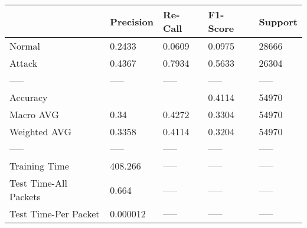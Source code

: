 \begin{tabular}{lllll}
\toprule
{} & Precision & Re-Call & F1-Score & Support \\
\midrule
Normal                &    0.2433 &  0.0609 &   0.0975 &   28666 \\
Attack                &    0.4367 &  0.7934 &   0.5633 &   26304 \\
-----                 &     ----- &   ----- &    ----- &   ----- \\
Accuracy              &           &         &   0.4114 &   54970 \\
Macro AVG             &      0.34 &  0.4272 &   0.3304 &   54970 \\
Weighted AVG          &    0.3358 &  0.4114 &   0.3204 &   54970 \\
-----                 &     ----- &   ----- &    ----- &   ----- \\
Training Time         &   408.266 &   ----- &    ----- &   ----- \\
Test Time-All Packets &     0.664 &   ----- &    ----- &   ----- \\
Test Time-Per Packet  &  0.000012 &   ----- &    ----- &   ----- \\
\bottomrule
\end{tabular}
